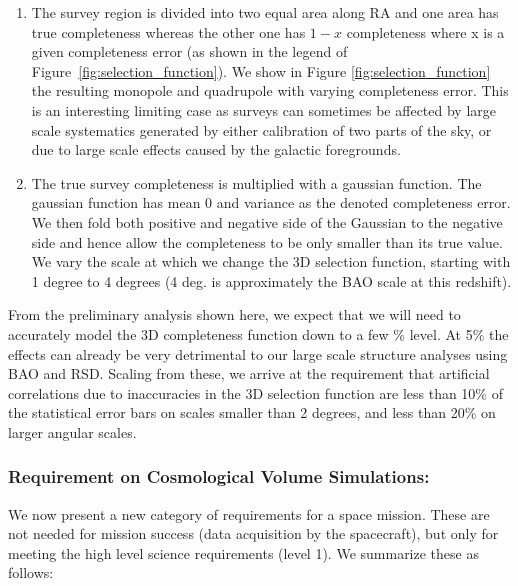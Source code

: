\begin{enumerate}
\item The survey region is divided into two equal area along RA and one area
 has true completeness whereas the other one has $1-x$ completeness where x is a
 given completeness error (as shown in the legend of Figure~\ref{fig:selection_function}).
 We show in Figure \ref{fig:selection_function} the resulting monopole and quadrupole with varying completeness error. This
 is an interesting limiting case as surveys can sometimes be affected by large
 scale systematics generated by either calibration of two parts of the sky, or
 due to large scale effects caused by the galactic foregrounds.
\item The true survey completeness is multiplied with a gaussian function. The
 gaussian function has mean 0 and variance as the denoted completeness error. We
 then fold both positive and negative side of the Gaussian to the negative side
 and hence allow the completeness to be only smaller than its true value. We vary
 the scale at which we change the 3D selection function, starting with 1 degree
 to 4 degrees (4 deg. is approximately the BAO scale at this redshift).
 \end{enumerate}

 From the preliminary analysis shown here, we expect that we will need to
 accurately model the 3D completeness function down to a few \% level.  At 5\%
 the effects can already be very detrimental to our large scale structure
 analyses using BAO and RSD. Scaling from these, we arrive at the requirement
 that artificial correlations due to inaccuracies in the 3D selection function
 are less than 10\% of the statistical error bars on scales smaller than 2
 degrees, and less than 20\% on larger angular scales.

 \subsubsection{Requirement on Cosmological Volume Simulations:} We now present a new category of requirements for a space mission. These are not needed
 for mission success (data acquisition by the spacecraft), but only for meeting the
 high level science requirements (level 1). We summarize these as follows:

